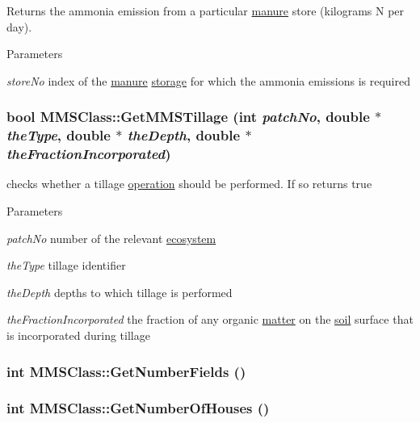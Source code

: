 Returns the ammonia emission from a particular \hyperlink{classmanure}{manure} store (kilograms N per day). 
\begin{DoxyParams}{Parameters}
\item[{\em storeNo}]index of the \hyperlink{classmanure}{manure} \hyperlink{classstorage}{storage} for which the ammonia emissions is required \end{DoxyParams}
\hypertarget{class_m_m_s_class_af0fdf59e2254ae73b27cbb61500a076f}{
\subsubsection[{GetMMSTillage}]{\setlength{\rightskip}{0pt plus 5cm}bool MMSClass::GetMMSTillage (int {\em patchNo}, \/  double $\ast$ {\em theType}, \/  double $\ast$ {\em theDepth}, \/  double $\ast$ {\em theFractionIncorporated})}}
\label{class_m_m_s_class_af0fdf59e2254ae73b27cbb61500a076f}


checks whether a tillage \hyperlink{classoperation}{operation} should be performed. If so returns true 
\begin{DoxyParams}{Parameters}
\item[{\em patchNo}]number of the relevant \hyperlink{classecosystem}{ecosystem} \item[{\em theType}]tillage identifier \item[{\em theDepth}]depths to which tillage is performed \item[{\em theFractionIncorporated}]the fraction of any organic \hyperlink{classmatter}{matter} on the \hyperlink{classsoil}{soil} surface that is incorporated during tillage \end{DoxyParams}
\hypertarget{class_m_m_s_class_a0667b939a3d01931d222696b140b5365}{
\subsubsection[{GetNumberFields}]{\setlength{\rightskip}{0pt plus 5cm}int MMSClass::GetNumberFields ()}}
\label{class_m_m_s_class_a0667b939a3d01931d222696b140b5365}
\hypertarget{class_m_m_s_class_adbc93d6a32b07724687b496aa0f863e2}{
\subsubsection[{GetNumberOfHouses}]{\setlength{\rightskip}{0pt plus 5cm}int MMSClass::GetNumberOfHouses ()}}
\label{class_m_m_s_class_adbc93d6a32b07724687b496aa0f863e2}


